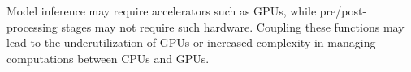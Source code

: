 Model inference may require \DIFdelbegin {}\DIFdelend \DIFaddbegin {}\DIFaddend accelerators such as GPUs, while pre/post-processing stages may not require such \DIFdelbegin {}\DIFdelend \DIFaddbegin {}\DIFaddend hardware. Coupling these functions may lead to the underutilization of GPUs or increased complexity in managing computations between CPUs and GPUs.





